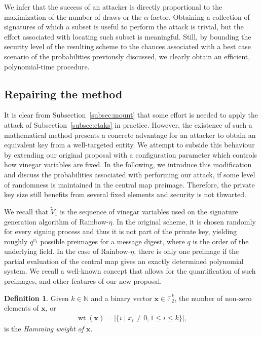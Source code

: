 \documentclass[12pt, a4paper, oneside]{memoir}
\DeclareMathOperator*{\wt}{wt}
\theoremstyle{definition}
\newtheorem{definition}[theorem]{Definition}
\begin{document}
We infer that the success of an attacker is directly proportional to the maximization of the number of draws or the $\alpha$ factor. Obtaining a collection of signatures of which a subset is useful to perform the attack is trivial, but the effort associated with locating such subset is meaningful. Still, by bounding the security level of the resulting scheme to the chances associated with a best case scenario of the probabilities previously discussed, we clearly obtain an efficient, polynomial-time procedure.

\subsection{Repairing the method}\label{subsec:repair}

It is clear from Subsection~\ref{subsec:mount} that some effort is needed to apply the attack of Subsection~\ref{subsec:etaks} in practice. However, the existence of such a mathematical method presents a concrete advantage for an attacker to obtain an equivalent key from a well-targeted entity. We attempt to subside this behaviour by extending our original proposal with a configuration parameter which controls how vinegar variables are fixed. In the following, we introduce this modification and discuss the probabilities associated with performing our attack, if some level of randomness is maintained in the central map preimage. Therefore, the private key size still benefits from several fixed elements and security is not thwarted.

We recall that $\widetilde{V}_{1}$ is the sequence of vinegar variables used on the signature generation algorithm of Rainbow-$\eta$. In the original scheme, it is chosen randomly for every signing process and thus it is not part of the private key, yielding roughly $q^{v_{1}}$ possible preimages for a message digest, where $q$ is the order of the underlying field. In the case of Rainbow-$\eta$, there is only one preimage if the partial evaluation of the central map gives an exactly determined polynomial system. We recall a well-known concept that allows for the quantification of such preimages, and other features of our new proposal.

\begin{definition}
  Given $k \in \mathbb{N}$ and a binary vector $\mathbf{x} \in \mathbb{F}_{2}^{k}$, the number of non-zero elements of $\mathbf{x}$, or
  \begin{align}
    \wt(\mathbf{x}) = |\{ i \mid x_{i} \neq 0, 1 \leq i \leq k \}|,
  \end{align}
  is the \emph{Hamming weight of $\mathbf{x}$}.
\end{definition}
\end{document}
